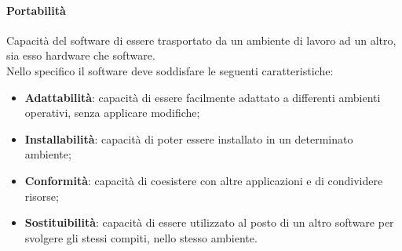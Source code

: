 		\paragraph{Portabilità}
		Capacità del software di essere trasportato da un ambiente di lavoro ad un altro, sia esso hardware che software.\\
		Nello specifico il software deve soddisfare le seguenti caratteristiche:
		\begin{itemize}
			\item \textbf{Adattabilità}:
			capacità di essere facilmente adattato a differenti ambienti operativi, senza applicare modifiche;
			\item \textbf{Installabilità}: capacità di poter essere installato in un determinato ambiente;
			\item \textbf{Conformità}: capacità di coesistere con altre applicazioni e di condividere risorse;
			\item \textbf{Sostituibilità}: capacità di essere utilizzato al posto di un altro software per svolgere gli stessi compiti, nello stesso ambiente.
		\end{itemize}